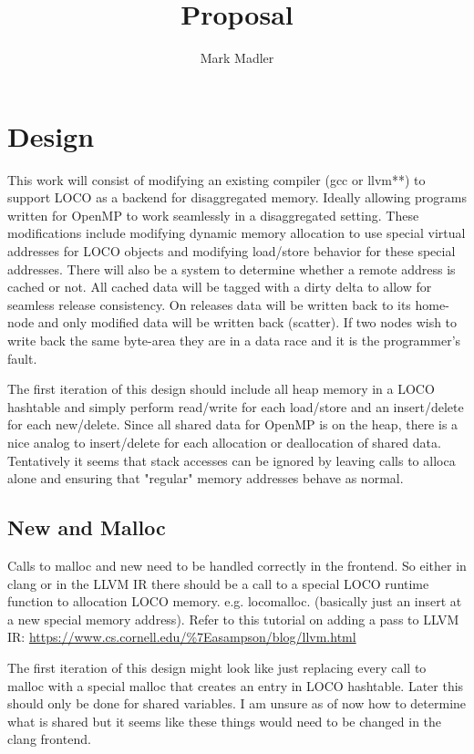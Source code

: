 \documentclass[sigplan,nonacm]{acmart}
\title{Proposal}
\author{Mark Madler}
\begin{document}
\maketitle

\section{Design}
This work will consist of modifying an existing compiler (gcc or llvm**) to 
support LOCO as a backend for disaggregated memory. Ideally allowing programs 
written for OpenMP to work seamlessly in a disaggregated setting.
These modifications include modifying dynamic memory allocation to use special 
virtual addresses for LOCO objects and modifying load/store behavior for these 
special addresses. 
There will also be a system to determine whether a remote address is cached or not.
All cached data will be tagged with a dirty delta to allow for seamless release consistency. 
On releases data will be written back to its home-node and only modified data will be written back 
(scatter). If two nodes wish to write back the same byte-area they are in a data race 
and it is the programmer's fault. 

The first iteration of this design should include all heap memory in a LOCO hashtable and
simply perform read/write for each load/store and an insert/delete for each new/delete. 
Since all shared data for OpenMP is on the heap, there is a nice analog to insert/delete 
for each allocation or deallocation of shared data. Tentatively it seems that stack
accesses can be ignored by leaving calls to alloca alone and ensuring that "regular" 
memory addresses behave as normal.

\subsection{New and Malloc}
Calls to malloc and new need to be handled correctly in the frontend. So either in clang
or in the LLVM IR there should be a call to a special LOCO runtime function to allocation 
LOCO memory. e.g. locomalloc. (basically just an insert at a new special memory address).
Refer to this tutorial on adding a pass to LLVM IR: \url{https://www.cs.cornell.edu/%7Easampson/blog/llvm.html}

The first iteration of this design might look like just replacing every call to malloc 
with a special malloc that creates an entry in LOCO hashtable. Later this should only 
be done for shared variables. I am unsure as of now how to determine what is shared
but it seems like these things would need to be changed in the clang frontend.
\end{document}

